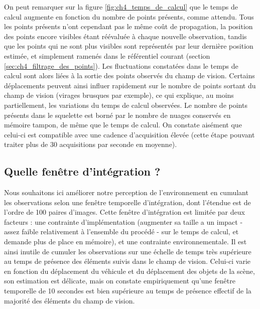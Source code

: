 On peut remarquer sur la figure \ref{fig:ch4_temps_de_calcul} que le temps de calcul augmente en fonction du nombre de points présents, comme attendu. Tous les points présents n'ont cependant pas le même coût de propagation, la position des points encore visibles étant réévaluée à chaque nouvelle observation, tandis que les points qui ne sont plus visibles sont représentés par leur dernière position estimée, et simplement ramenés dans le référentiel courant (section \ref{sec:ch4_filtrage_des_points}). Les fluctuations constatées dans le temps de calcul sont alors liées à la sortie des points observés du champ de vision. Certains déplacements peuvent ainsi influer rapidement sur le nombre de points sortant du champ de vision (virages brusques par exemple), ce qui explique, au moins partiellement, les variations du temps de calcul observées. Le nombre de points présents dans le squelette est borné par le nombre de nuages conservés en mémoire tampon, de même que le temps de calcul. On constate aisément que celui-ci est compatible avec une cadence d'acquisition élevée (cette étape pouvant traiter plus de 30 acquisitions par seconde en moyenne).\\

\subsection{Quelle fenêtre d'intégration ?}
Nous souhaitons ici améliorer notre perception de l'environnement en cumulant les observations selon une fenêtre temporelle d'intégration, dont l'étendue est de l'ordre de 100 paires d'images. Cette fenêtre d'intégration est limitée par deux facteurs : une contrainte d'implémentation (augmenter sa taille a un impact - assez faible relativement à l'ensemble du procédé - sur le temps de calcul, et demande plus de place en mémoire), et une contrainte environnementale. Il est ainsi inutile de cumuler les observations sur une échelle de temps très supérieure au temps de présence des éléments suivis dans le champ de vision. Celui-ci varie en fonction du déplacement du véhicule et du déplacement des objets de la scène, son estimation est délicate, mais on constate empiriquement qu'une fenêtre temporelle de 10 secondes est bien supérieure au temps de présence effectif de la majorité des éléments du champ de vision.\\

